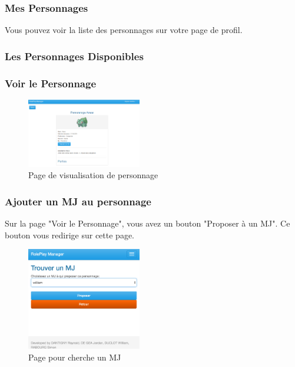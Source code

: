 \documentclass[a4paper,oneside,10pt]{article}
\begin{document}
\subsubsection{Mes Personnages}
\label{MUMesPersonnages}

Vous pouvez voir la liste des personnages sur votre page de profil. 

\subsubsection{Les Personnages Disponibles}
\label{MULesPersonnagesDisponibles}


\subsubsection{Voir le Personnage}
\label{MUVoirLePersonnage}

\begin{figure}[H]
	\begin{center}
		\includegraphics[width=5cm]{images/manuel/voirpersonnage.png}  
		\caption{Page de visualisation de personnage}
	\end{center}
\end{figure}

\subsubsection{Ajouter un MJ au personnage}
\label{MUAjouterMJPersonnage}


Sur la page "Voir le Personnage", vous avez un bouton "Proposer à un MJ". Ce bouton vous redirige sur cette page. 

\begin{figure}[H]
	\begin{center}
		\includegraphics[width=5cm]{images/manuel/trouverMJ.png}  
		\caption{Page pour cherche un MJ}
	\end{center}
\end{figure}
\end{document}
